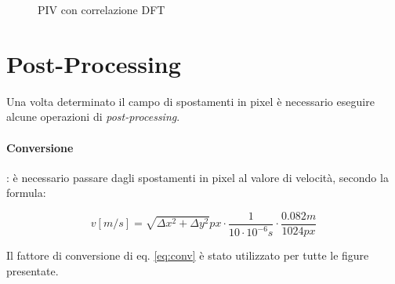 \documentclass[a4paper]{article}
\begin{document}
\begin{figure}[ht]
	\centering
	\caption{PIV con correlazione DFT}
	\label{fig:dft}
\end{figure}


\section{Post-Processing}

Una volta determinato il campo di spostamenti in pixel è necessario eseguire alcune operazioni di \textit{post-processing}.

\paragraph{Conversione}: è necessario passare dagli spostamenti in pixel al valore di velocità, secondo la formula:

\begin{equation}
v \left[m/s\right] = \sqrt{\Delta x^2 + \Delta y^2}px \cdot \frac{1}{10\cdot10^{-6}s} \cdot \frac{0.082m}{1024px}
\label{eq:conv}
\end{equation}

Il fattore di conversione di eq. \ref{eq:conv} è stato utilizzato per tutte le figure presentate.
\end{document}
